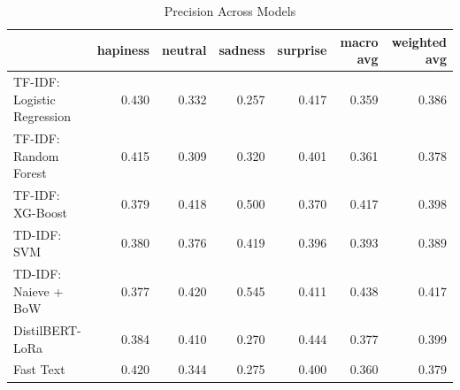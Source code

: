 \begin{table}
\caption{Precision Across Models}
\begin{tabular}{lrrrrrr}
\toprule
 & hapiness & neutral & sadness & surprise & macro avg & weighted avg \\
\midrule
TF-IDF: Logistic Regression & 0.430 & 0.332 & 0.257 & 0.417 & 0.359 & 0.386 \\
TF-IDF: Random Forest & 0.415 & 0.309 & 0.320 & 0.401 & 0.361 & 0.378 \\
TF-IDF: XG-Boost & 0.379 & 0.418 & 0.500 & 0.370 & 0.417 & 0.398 \\
TD-IDF: SVM & 0.380 & 0.376 & 0.419 & 0.396 & 0.393 & 0.389 \\
TD-IDF: Naieve + BoW & 0.377 & 0.420 & 0.545 & 0.411 & 0.438 & 0.417 \\
DistilBERT-LoRa & 0.384 & 0.410 & 0.270 & 0.444 & 0.377 & 0.399 \\
Fast Text & 0.420 & 0.344 & 0.275 & 0.400 & 0.360 & 0.379 \\
\bottomrule
\end{tabular}
\end{table}
